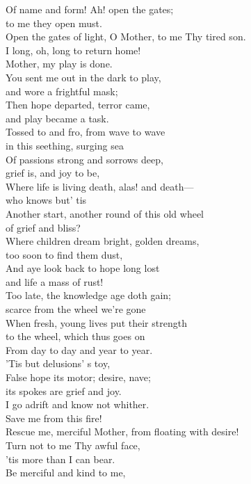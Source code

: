 \begin{myquote}
{Of name and form! Ah! open the gates;\\
to me they open must.\\
Open the gates of light, O Mother, to me Thy tired son.\\
I long, oh, long to return home!\\
Mother, my play is done.\\
You sent me out in the dark to play,\\
and wore a frightful mask;\\
Then hope departed, terror came,\\
and play became a task.\\
Tossed to and fro, from wave to wave\\
in this seething, surging sea\\
Of passions strong and sorrows deep,\\
grief is, and joy to be,\\
Where life is living death, alas! and death—\\
who knows but’ tis\\
Another start, another round of this old wheel\\
of grief and bliss?\\
Where children dream bright, golden dreams,\\
too soon to find them dust,\\
And aye look back to hope long lost\\
and life a mass of rust!\\
Too late, the knowledge age doth gain;\\
scarce from the wheel we’re gone\\
When fresh, young lives put their strength\\
to the wheel, which thus goes on\\
From day to day and year to year.\\
’Tis but delusions’ s toy,\\
False hope its motor; desire, nave;\\
its spokes are grief and joy.\\
I go adrift and know not whither.\\
Save me from this fire!\\
Rescue me, merciful Mother, from floating with desire!\\
Turn not to me Thy awful face,\\
’tis more than I can bear.\\
Be merciful and kind to me,\\
}
\end{myquote}
